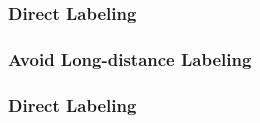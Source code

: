 \documentclass[12pt]{beamer}\usepackage[]{graphicx}\usepackage[]{color}
\begin{document}

\begin{frame}
\frametitle{Direct Labeling}
\begin{center}
\end{center}
\end{frame}


\begin{frame}
\frametitle{Avoid Long-distance Labeling}
\begin{center}
\end{center}
\end{frame}


\begin{frame}
\frametitle{Direct Labeling}
\begin{center}
\end{center}
\end{frame}

\end{document}
